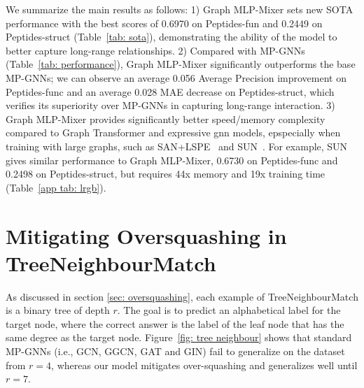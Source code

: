 \documentclass{article}
\begin{document}
We summarize the main results as follows: 1) Graph MLP-Mixer sets new SOTA performance with the best scores of 0.6970 on Peptides-fun and 0.2449 on Peptides-struct (Table~\ref{tab: sota}), demonstrating the ability of the model to better capture long-range relationships.
2) Compared with MP-GNNs (Table~\ref{tab: performance}), Graph MLP-Mixer significantly outperforms the base MP-GNNs; we can observe an average 0.056 Average Precision improvement on Peptides-func and an average 0.028 MAE decrease on Peptides-struct, which verifies its superiority over MP-GNNs in capturing long-range interaction.
3) Graph MLP-Mixer provides significantly better speed/memory complexity compared to Graph Transformer and expressive gnn models, epspecially when training with large graphs, such as SAN+LSPE~\citep{chen2022structure_SAT} and SUN~\citep{sun}. For example, SUN gives similar performance to Graph MLP-Mixer, 0.6730 on Peptides-func and 0.2498 on Peptides-struct, but requires 44x memory and 19x training time (Table~\ref{app tab: lrgb}). 




\section{Mitigating Oversquashing in TreeNeighbourMatch}\label{app_sec: oversquashing}

As discussed in section \ref{sec: oversquashing}, 
each example of TreeNeighbourMatch is a binary tree of depth $r$. The goal is to predict an alphabetical label for the target node, where the correct answer is the label of the leaf node that has the same degree as the target node. Figure~\ref{fig: tree neighbour} shows that standard MP-GNNs (i.e., GCN, GGCN, GAT and GIN) fail to generalize on the dataset from $r=4$, whereas
our model mitigates over-squashing and generalizes well until $r=7$.
\end{document}
